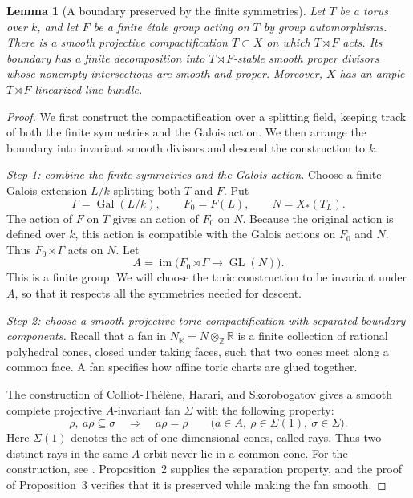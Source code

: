 \documentclass[11pt,reqno]{amsart}
\newtheorem{lemma}[theorem]{Lemma}
\theoremstyle{definition}
\theoremstyle{remark}
\theoremstyle{plain}
\numberwithin{equation}{section}
\begin{document}
\begin{lemma}[A boundary preserved by the finite symmetries]
\label{lem:new-strict-toric-boundary}
Let \(T\) be a torus over \(k\), and let \(F\) be a finite \'{e}tale group
acting on \(T\) by group automorphisms.
There is a smooth projective compactification \(T\subset X\) on which
\(T\rtimes F\) acts.
Its boundary has a finite decomposition into \(T\rtimes F\)-stable smooth
proper divisors whose nonempty intersections are smooth and proper.
Moreover, \(X\) has an ample \(T\rtimes F\)-linearized line bundle.
\end{lemma}
\begin{proof}
We first construct the compactification over a splitting field,
keeping track of both the finite symmetries and the Galois action.
We then arrange the boundary into invariant smooth divisors and
descend the construction to \(k\).

\smallskip
\noindent\emph{Step 1: combine the finite symmetries and the Galois action.}
Choose a finite Galois extension \(L/k\) splitting both \(T\) and \(F\).
Put
\[
 \Gamma=\operatorname{Gal}(L/k),\qquad
 F_0=F(L),\qquad
 N=X_*(T_L).
\]
The action of \(F\) on \(T\) gives an action of \(F_0\) on \(N\).
Because the original action is defined over \(k\), this action
is compatible with the Galois actions on \(F_0\) and \(N\).
Thus \(F_0\rtimes\Gamma\) acts on \(N\).
Let
\[
 A=\operatorname{im}\bigl(F_0\rtimes\Gamma
                 \longrightarrow\operatorname{GL}(N)\bigr).
\]
This is a finite group. We will choose the toric construction
to be invariant under \(A\), so that it respects all the
symmetries needed for descent.

\smallskip
\noindent\emph{Step 2: choose a smooth projective toric compactification
with separated boundary components.}
Recall that a fan in \(N_{\mathbb R}=N\otimes_{\mathbb Z}\mathbb R\)
is a finite collection of rational polyhedral cones, closed under
taking faces, such that two cones meet along a common face.
A fan specifies how affine toric charts are glued together.

The construction of Colliot-Th\'el\`ene, Harari, and Skorobogatov
gives a smooth complete projective \(A\)-invariant fan \(\Sigma\)
with the following property:
\begin{equation}\label{eq:new-separated-fan}
 \rho,\ a\rho\subseteq\sigma
 \quad\Longrightarrow\quad
 a\rho=\rho
 \qquad
 \bigl(a\in A,\ \rho\in\Sigma(1),\ \sigma\in\Sigma\bigr).
\end{equation}
Here \(\Sigma(1)\) denotes the set of one-dimensional cones,
called rays.
Thus two distinct rays in the same \(A\)-orbit never lie in
a common cone.
For the construction, see
\cite[Theorem~1, Proposition~2, and the proof of Proposition~3]{CTHS}.
Proposition~2 supplies the separation property, and the proof
of Proposition~3 verifies that it is preserved while making
the fan smooth.


\end{proof}
\end{document}
